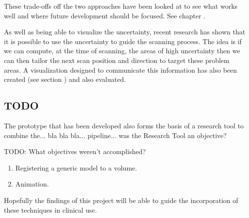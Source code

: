 These trade-offs off the two approaches have been looked at to see what works well and where future development should be focused. See chapter \cite{chapter:evaluation}.

As well as being able to visualize the uncertainty, recent research\cite{uncertaintysvd} has shown that it is possible to use the uncertainty to guide the scanning process. The idea is if we can compute, at the time of scanning, the areas of high uncertainty then we can then tailor the next scan position and direction to target these problem areas. A visualization designed to communicate this information has also been created (see section \cite{section:nextscanplane}) and also evaluated.

\subsection{TODO}
The prototype that has been developed also forms the basis of a research tool to combine the... bla bla bla... pipeline... was the Research Tool an objective?

TODO: What objectives weren't accomplished?
\begin{enumerate}
	\item Registering a generic model to a volume.
	\item Animation.	
\end{enumerate}

Hopefully the findings of this project will be able to guide the incorporation of these techniques in clinical use.

